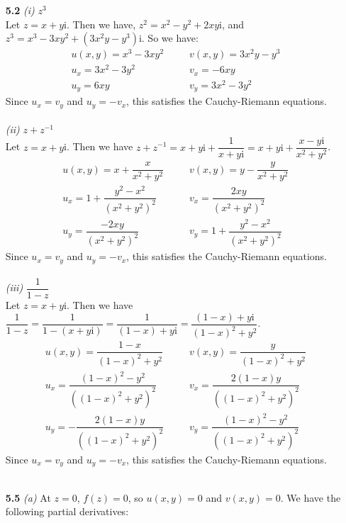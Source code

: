 \begin{enumerate}
\item[\textbf{5.2}] 
\textit{(i)}
$z^3$ \\
Let $z=x+y$i. Then we have, $z^2 = x^2 - y^2 + 2xy$i, and $z^3 = x^3 - 3xy^2 +(3x^2y-y^3)$i.
So we have:
\begin{align*}
u(x,y) = x^3 - 3xy^2 ~~~~&~~~~ v(x,y) = 3x^2y-y^3 \\
u_x = 3x^2-3y^2 ~~~~&~~~~ v_x = -6xy \\
u_y = 6xy ~~~~&~~~~ v_y = 3x^2-3y^2 
\end{align*}
Since $u_x = v_y$ and $u_y = -v_x$, this satisfies the Cauchy-Riemann equations.
\\\\
\textit{(ii)}
$z+z^{-1}$\\
Let $z=x+y$i. Then we have $z+z^{-1} = x+y\mathrm{i}+\dfrac{1}{x+y\mathrm{i}} = x+y\mathrm{i}+\dfrac{x-y\mathrm{i}}{x^2+y^2}$.
\begin{align*}
u(x,y) = x+\dfrac{x}{x^2+y^2} ~~~~&~~~~ v(x,y) = y-\dfrac{y}{x^2+y^2} \\
u_x = 1+\dfrac{y^2-x^2}{(x^2+y^2)^2} ~~~~&~~~~ v_x = \dfrac{2xy}{(x^2+y^2)^2}\\
u_y = \dfrac{-2xy}{(x^2+y^2)^2} ~~~~&~~~~ v_y = 1+\dfrac{y^2-x^2}{(x^2+y^2)^2}
\end{align*}
Since $u_x = v_y$ and $u_y = -v_x$, this satisfies the Cauchy-Riemann equations.
\\\\
\textit{(iii)}
$\dfrac{1}{1-z}$ \\
Let $z=x+y$i. Then we have $\dfrac{1}{1-z} =
\dfrac{1}{1-(x+y\mathrm{i})}=
\dfrac{1}{(1-x)+y\mathrm{i}}=
\dfrac{(1-x)+y\mathrm{i}}{(1-x)^2+y^2}$.
\begin{align*}
u(x,y) = \dfrac{1-x}{(1-x)^2+y^2}
~~~~&~~~~ 
v(x,y) = \dfrac{y}{(1-x)^2+y^2} \\
u_x = \dfrac{(1-x)^2-y^2}{((1-x)^2+y^2)^2} 
~~~~&~~~~
v_x = \dfrac{2(1-x)y}{((1-x)^2+y^2)^2}\\
u_y = -\dfrac{2(1-x)y}{((1-x)^2+y^2)^2} 
~~~~&~~~~
v_y = \dfrac{(1-x)^2-y^2}{((1-x)^2+y^2)^2}
\end{align*}
Since $u_x = v_y$ and $u_y = -v_x$, this satisfies the Cauchy-Riemann equations.
\\\\
\item[\textbf{5.5}] 
\textit{(a)}
At $z=0$, $f(z) = 0$, so $u(x,y) = 0$ and $v(x,y) = 0$. We have the following partial derivatives: \\
\begin{align*}

\end{align*}
\end{enumerate}
